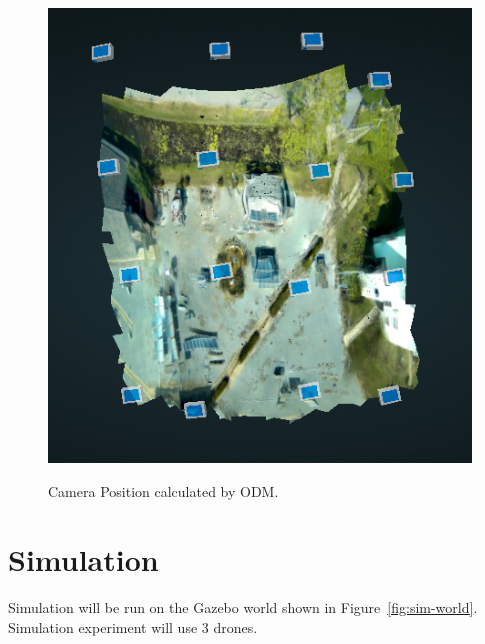 \begin{figure}
	\centering
	\caption[Camera Position calculated by ODM.]{\small Camera Position calculated by ODM.} 
	\includegraphics[width=5in]{figures/experiment/camera-position}
	\label{fig:real-camera-position}
\end{figure}

\section{Simulation}

Simulation will be run on the Gazebo world shown in Figure~\ref{fig:sim-world}. Simulation experiment will use 3 drones. 


